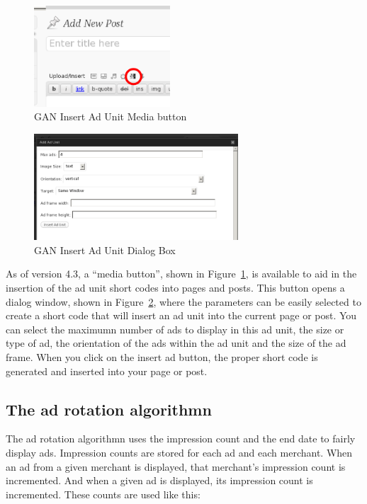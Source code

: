 \documentclass[letterpaper]{article}
\begin{document}
\begin{figure}[ht]
\begin{centering}
\includegraphics[width=2in]{ganmediabutton.png}
\caption{GAN Insert Ad Unit Media button}
\label{fig:ganmediabutton}
\end{centering}
\end{figure}
\begin{figure}[ht]
\begin{centering}
\includegraphics[width=3in]{ganinsertaddialog.png}
\caption{GAN Insert Ad Unit Dialog Box}
\label{fig:ganinsertaddialog}
\end{centering}
\end{figure}
As of version 4.3, a ``media button'', shown in
Figure~\ref{fig:ganmediabutton}, is available to aid in the insertion
of the ad unit short codes into pages and posts.  This button opens a
dialog window, shown in Figure~\ref{fig:ganinsertaddialog}, where the
parameters can be easily selected to create a short code that will
insert an ad unit into the current page or post. You can select the
maximumn number of ads to display in this ad unit, the size or type of
ad, the orientation of the ads within the ad unit and the size of the
ad frame. When you click on the insert ad button, the proper short code
is generated and inserted into your page or post.

\subsection{The ad rotation algorithmn}

The ad rotation algorithmn uses the impression count and the end date to
fairly display ads.  Impression counts are stored for each ad and each
merchant.  When an ad from a given merchant is displayed, that
merchant's impression count is incremented.  And when a given ad is
displayed, its impression count is incremented.  These counts are used
like this:
\end{document}
